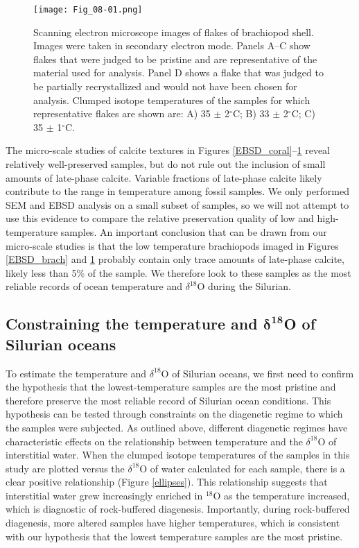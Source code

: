 \documentclass[5p, authoryear]{elsarticle}
\newcommand{\deltao}{$\delta^{18}$}
\newcommand{\degrees}{$^{\circ}$}
\begin{document}
\begin{figure}[h]
\centering
\texttt{[image: Fig\_08-01.png]}
\caption{Scanning electron microscope images of flakes of brachiopod shell. Images were taken in secondary electron mode. Panels A--C show flakes that were judged to be pristine and are representative of the material used for analysis. Panel D shows a flake that was judged to be partially recrystallized and would not have been chosen for analysis. Clumped isotope temperatures of the samples for which representative flakes are shown are: A) 35 $\pm$ 2\degrees C; B) 33 $\pm$ 2\degrees C; C) 35 $\pm$ 1\degrees C.}
\label{flakes}
\end{figure}

The micro-scale studies of calcite textures in Figures \ref{EBSD_coral}--\ref{flakes} reveal relatively well-preserved samples, but do not rule out the inclusion of small amounts of late-phase calcite. Variable fractions of late-phase calcite likely contribute to the range in temperature among fossil samples. We only performed SEM and EBSD analysis on a small subset of samples, so we will not attempt to use this evidence to compare the relative preservation quality of low and high-temperature samples. An important conclusion that can be drawn from our micro-scale studies is that the low temperature brachiopods imaged in Figures \ref{EBSD_brach} and \ref{flakes} probably contain only trace amounts of late-phase calcite, likely less than 5\% of the sample. We therefore look to these samples as the most reliable records of ocean temperature and \deltao O during the Silurian. 

\subsection{Constraining the temperature and $\mathbf{\delta^{18}}$O of Silurian oceans} 

To estimate the temperature and \deltao O of Silurian oceans, we first need to confirm the hypothesis that the lowest-temperature samples are the most pristine and therefore preserve the most reliable record of Silurian ocean conditions. This hypothesis can be tested through constraints on the diagenetic regime to which the samples were subjected. As outlined above, different diagenetic regimes have characteristic effects on the relationship between temperature and the \deltao O of interstitial water. When the clumped isotope temperatures of the samples in this study are plotted versus the \deltao O of water calculated for each sample, there is a clear positive relationship (Figure \ref{ellipses}). This relationship suggests that interstitial water grew increasingly enriched in $^{18}$O as the temperature increased, which is diagnostic of rock-buffered diagenesis. Importantly, during rock-buffered diagenesis, more altered samples have higher temperatures, which is consistent with our hypothesis that the lowest temperature samples are the most pristine.
\end{document}
